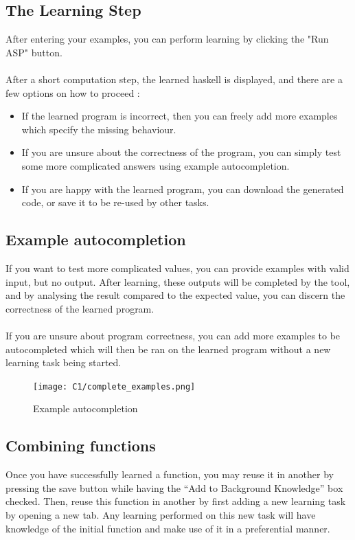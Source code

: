 \subsection{The Learning Step}

After entering your examples, you can perform learning by clicking the "Run ASP" button. \\ \\
After a short computation step, the learned haskell is displayed, and there are a few options on how to proceed : 

\begin{itemize}
\item If the learned program is incorrect, then you can freely add more examples which specify the missing behaviour.
\item If you are unsure about the correctness of the program, you can simply test some more complicated answers using example autocompletion.
\item If you are happy with the learned program, you can download the generated code, or save it to be re-used by other tasks.
\end{itemize}  

\subsection{Example autocompletion}

If you want to test more complicated values, you can provide examples with valid input, but no output. After learning, these outputs will be completed by the tool, and by analysing the result compared to the expected value, you can discern the correctness of the learned program. \\ \\
If you are unsure about program correctness, you can add more examples to be autocompleted which will then be ran on the learned program without a new learning task being started.

\begin{figure}[h!]
\centering
\texttt{[image: C1/complete\_examples.png]}
\caption{Example autocompletion}
\end{figure}

\subsection{Combining functions}

Once you have successfully learned a function, you may reuse it in another by pressing the save button while having the ``Add to Background Knowledge'' box checked. Then, reuse this function in another by first adding a new learning task by opening a new tab. Any learning performed on this new task will have knowledge of the initial function and make use of it in a preferential manner.

